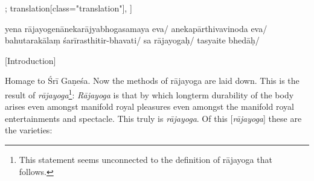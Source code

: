 \documentclass[12pt]{article}%
\def\om{\textrm{\footnotesize \textit{omitted in}\ }} %
\begin{document}
\begin{alignment}[
    texts=edition[class="edition"];
    translation[class="translation"],
    ]
\begin{edition}
\begin{prose}
      yena rājayogenānekarājyabhogasamaya eva/ anekapārthivavinoda
      eva/ bahutarakālaṃ śarīrasthitir-bhavati/ sa
      rājayogaḥ/ \bigskip
       tasyaite bhedāḥ/
     \end{prose}
     \end{edition}
      \begin{translation}
    \centerline{\textrm{\small{[Introduction]}}}
    \bigskip
    \begin{tlate}Homage to Śrī Gaṇeśa. Now the methods of rājayoga are laid down. This is the result of \textit{rājayoga}\footnote{This statement seems unconnected to the definition of rājayoga that follows.}: \textit{Rājayoga} is that by which longterm durability of the body arises even amongst manifold royal pleasures even amongst the manifold royal entertainments and spectacle. This truly is \textit{rājayoga}. Of this [\textit{rājayoga}] these are the varieties: \end{tlate}
      \bigskip
       \end{translation}
        

\end{alignment}
\end{document}
